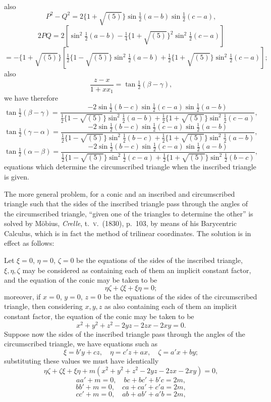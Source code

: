 \documentclass[11pt]{article}
\begin{document}
also
\[ P^{2}-Q^{2}=2\{1+\sqrt{(5)}\}\sin\tfrac{1}{2}(a-b)\sin\tfrac{1}{2}(c-a), \]
\[ 2PQ=2[\sin^{2}\tfrac{1}{2}(a-b)-\tfrac{1}{4}\{1+\sqrt{(5)}\}^{2}\sin^{2}\tfrac{1}{2}(c-a)] \]
\[ =-\{1+\sqrt{(5)}\}[\tfrac{1}{2}\{1-\sqrt{(5)}\}\sin^{2}\tfrac{1}{2}(a-b)+\tfrac{1}{2}\{1+\sqrt{(5)}\}\sin^{2}\tfrac{1}{2}(c-a)]; \]
also
\[ \dfrac{z-x}{1+xx_{1}}=\tan\tfrac{1}{2}(\beta-\gamma), \]
we have therefore
\[ \tan\tfrac{1}{2}(\beta-\gamma)=\dfrac{-2\sin\tfrac{1}{2}(b-c)\sin\tfrac{1}{2}(c-a)\sin\tfrac{1}{2}(a-b)}{\tfrac{1}{2}\{1-\sqrt{(5)}\}\sin^{2}\tfrac{1}{2}(a-b)+\tfrac{1}{2}\{1+\sqrt{(5)}\}\sin^{2}\tfrac{1}{2}(c-a)}, \]
\[ \tan\tfrac{1}{2}(\gamma-\alpha)=\dfrac{-2\sin\tfrac{1}{2}(b-c)\sin\tfrac{1}{2}(c-a)\sin\tfrac{1}{2}(a-b)}{\tfrac{1}{2}\{1-\sqrt{(5)}\}\sin^{2}\tfrac{1}{2}(b-c)+\tfrac{1}{2}\{1+\sqrt{(5)}\}\sin^{2}\tfrac{1}{2}(a-b)}, \]
\[ \tan\tfrac{1}{2}(\alpha-\beta)=\dfrac{-2\sin\tfrac{1}{2}(b-c)\sin\tfrac{1}{2}(c-a)\sin\tfrac{1}{2}(a-b)}{\tfrac{1}{2}\{1-\sqrt{(5)}\}\sin^{2}\tfrac{1}{2}(c-a)+\tfrac{1}{2}\{1+\sqrt{(5)}\}\sin^{2}\tfrac{1}{2}(b-c)}, \]
equations which determine the circumscribed triangle when the inscribed triangle is
given.

The more general problem, for a conic and an inscribed and circumscribed triangle
such that the sides of the inscribed triangle pass through the angles of the
circumscribed triangle, ``given one of the triangles to determine the other'' is
solved by M\"obius, \textit{Crelle}, t.\ \textsc{v}.\ (1830), p.\ 103, by means of his
Barycentric Calculus, which is in fact the method of trilinear coordinates. The
solution is in effect as follows:

Let $\xi=0$, $\eta=0$, $\zeta=0$ be the equations of the sides of the inscribed
triangle, $\xi,\eta,\zeta$ may be considered as containing each of them an implicit
constant factor, and the equation of the conic may be taken to be
\[ \eta\zeta+\zeta\xi+\xi\eta=0; \]
moreover, if $x=0$, $y=0$, $z=0$ be the equations of the sides of the circumscribed
triangle, then considering $x,y,z$ as also containing each of them an implicit
constant factor, the equation of the conic may be taken to be
\[ x^{2}+y^{2}+z^{2}-2yz-2zx-2xy=0. \]
Suppose now the sides of the inscribed triangle pass through the angles of the
circumscribed triangle, we have equations such as
\[ \xi=b'y+cz,\quad \eta=c'z+ax,\quad \zeta=a'x+by; \]
substituting these values we must have identically
\[ \eta\zeta+\zeta\xi+\xi\eta+m(x^{2}+y^{2}+z^{2}-2yz-2zx-2xy)=0, \]
\[ aa'+m=0,\quad bc+bc'+b'c=2m, \]
\[ bb'+m=0,\quad ca+ca'+c'a=2m, \]
\[ cc'+m=0,\quad ab+ab'+a'b=2m, \]
\end{document}
